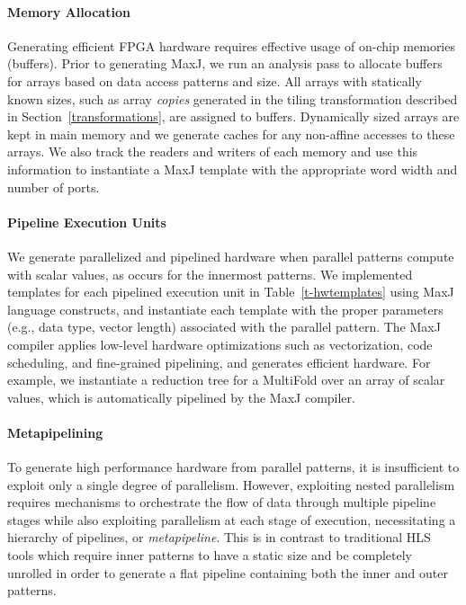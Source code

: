 \documentclass[pageno]{jpaper}
\begin{document}
\paragraph{Memory Allocation}
Generating efficient FPGA hardware requires effective usage of on-chip memories (buffers).
Prior to generating MaxJ, we run an analysis pass to allocate buffers for arrays based on data access patterns and size.
All arrays with statically known sizes, such as array \emph{copies} generated in the tiling transformation described in
Section~\ref{transformations}, are assigned to buffers. Dynamically sized arrays are kept in main memory and we generate
caches for any non-affine accesses to these arrays.
We also track the readers and writers of each memory and use this information
to instantiate a MaxJ template with the appropriate word width and number of ports.





\paragraph{Pipeline Execution Units}
We generate parallelized and pipelined hardware when parallel patterns compute with scalar values,
as occurs for the innermost patterns.
We implemented templates for each
pipelined execution unit in Table~\ref{t-hwtemplates} using MaxJ language
constructs, and instantiate each template with the proper parameters (e.g., data type,
vector length) associated with the parallel pattern.  The MaxJ compiler
applies low-level hardware optimizations such as vectorization, code
scheduling, and fine-grained pipelining, and generates efficient hardware.  For
example, we instantiate a reduction tree for a MultiFold over an
array of scalar values, which is automatically pipelined by the MaxJ compiler.

\paragraph{Metapipelining}
To generate high performance hardware from parallel patterns, it is insufficient to exploit only a single degree of parallelism.
However, exploiting nested parallelism requires mechanisms to orchestrate
the flow of data through multiple pipeline stages while also exploiting parallelism at each stage of execution,
necessitating a hierarchy of pipelines, or \emph{metapipeline}.
This is in contrast to traditional HLS tools which require inner patterns to have a static size and be completely unrolled in order to generate a flat pipeline containing both the inner and outer patterns.
\end{document}
